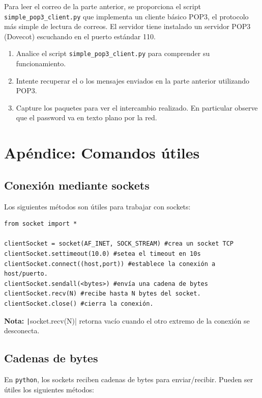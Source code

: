 \documentclass[a4paper,10pt]{article}
\begin{document}
Para leer el correo de la parte anterior, se proporciona el script \texttt{simple\_pop3\_client.py} que implementa un cliente básico POP3, el protocolo más simple de lectura de correos. El servidor tiene instalado un servidor POP3 (Dovecot) escuchando en el puerto estándar 110.

\begin{enumerate}
    \item Analice el script \texttt{simple\_pop3\_client.py} para comprender su funcionamiento.
    \item Intente recuperar el o los mensajes enviados en la parte anterior utilizando POP3.
    \item Capture los paquetes para ver el intercambio realizado. En particular observe que el password va en texto plano por la red.
\end{enumerate}



\appendix

\section*{Apéndice: Comandos útiles}

\subsection*{Conexión mediante sockets}

Los siguientes métodos son útiles para trabajar con sockets:
\begin{verbatim}
from socket import *

clientSocket = socket(AF_INET, SOCK_STREAM) #crea un socket TCP
clientSocket.settimeout(10.0) #setea el timeout en 10s
clientSocket.connect((host,port)) #establece la conexión a host/puerto.
clientSocket.sendall(<bytes>) #envía una cadena de bytes
clientSocket.recv(N) #recibe hasta N bytes del socket.
clientSocket.close() #cierra la conexión.
\end{verbatim}

\textbf{Nota:} \texttt|socket.recv(N)| retorna vacío cuando el otro extremo de la conexión se desconecta.
\subsection*{Cadenas de bytes}

En \texttt{python}, los sockets reciben cadenas de bytes para enviar/recibir. Pueden ser útiles los siguientes métodos:
\end{document}

